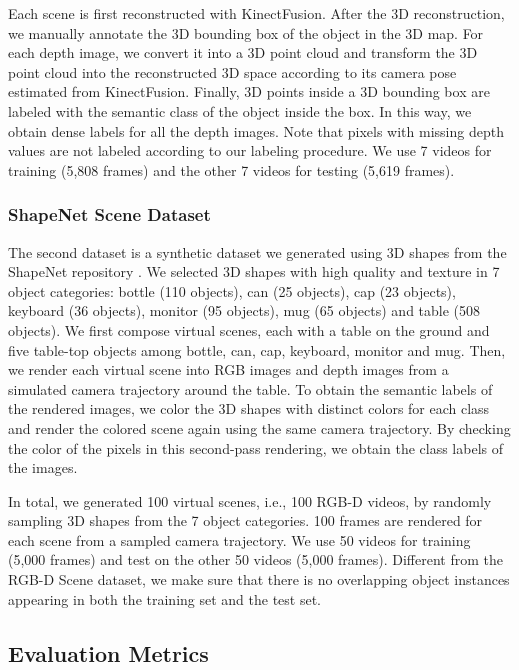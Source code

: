 \documentclass[conference]{IEEEtran}
\begin{document}
Each scene is first reconstructed with KinectFusion. After the 3D reconstruction, we manually annotate the 3D bounding box of the object in the 3D map. For each depth image, we convert it into a 3D point cloud and transform the 3D point cloud into the reconstructed 3D space according to its camera pose estimated from KinectFusion. Finally, 3D points inside a 3D bounding box are labeled with the semantic class of the object inside the box. In this way, we obtain dense labels for all the depth images. Note that pixels with missing depth values are not labeled according to our labeling procedure. We use 7 videos for training (5,808 frames) and the other 7 videos for testing (5,619 frames).

\subsubsection{ShapeNet Scene Dataset}


The second dataset is a synthetic dataset we generated using 3D shapes from the ShapeNet repository \cite{chang2015shapenet}. We selected 3D shapes with high quality and texture in 7 object categories: bottle (110 objects), can (25 objects), cap (23 objects), keyboard (36 objects), monitor (95 objects), mug (65 objects) and table (508 objects). We first compose virtual scenes, each with a table on the ground and five table-top objects among bottle, can, cap, keyboard, monitor and mug. Then, we render each virtual scene into RGB images and depth images from a simulated camera trajectory around the table. To obtain the semantic labels of the rendered images, we color the 3D shapes with distinct colors for each class and render the colored scene again using the same camera trajectory. By checking the color of the pixels in this second-pass rendering, we obtain the class labels of the images.

In total, we generated 100 virtual scenes, i.e., 100 RGB-D videos, by randomly sampling 3D shapes from the 7 object categories. 100 frames are rendered for each scene from a sampled camera trajectory. We use 50 videos for training (5,000 frames) and test on the other 50 videos (5,000 frames). Different from the RGB-D Scene dataset, we make sure that there is no overlapping object instances appearing in both the training set and the test set.

\subsection{Evaluation Metrics}
\end{document}
